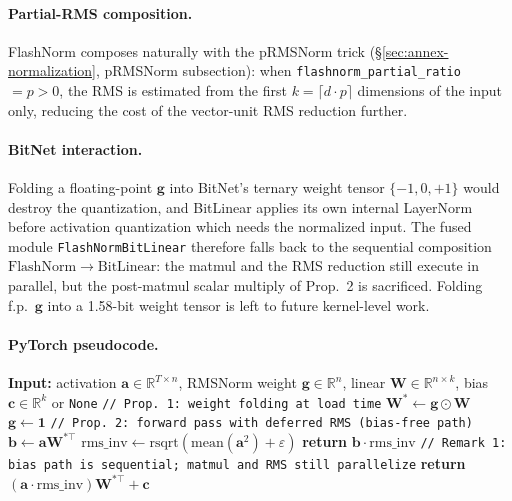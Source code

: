 \paragraph{Partial-RMS composition.}
FlashNorm composes naturally with the pRMSNorm trick (§\ref{sec:annex-normalization}, pRMSNorm subsection): when \texttt{flashnorm\_partial\_ratio} $=p>0$, the RMS is estimated from the first $k=\lceil d\cdot p\rceil$ dimensions of the input only, reducing the cost of the vector-unit RMS reduction further.

\paragraph{BitNet interaction.}
Folding a floating-point $\mathbf{g}$ into BitNet's ternary weight tensor $\{-1,0,+1\}$ \citep{wang_bitnet_2023} would destroy the quantization, and BitLinear applies its own internal LayerNorm before activation quantization which needs the normalized input. The fused module \texttt{FlashNormBitLinear} therefore falls back to the sequential composition $\mathrm{FlashNorm}\to\mathrm{BitLinear}$: the matmul and the RMS reduction still execute in parallel, but the post-matmul scalar multiply of Prop.~2 is sacrificed. Folding f.p.~$\mathbf{g}$ into a 1.58-bit weight tensor is left to future kernel-level work.

\paragraph{PyTorch pseudocode.}
\begin{algorithmic}[1]
\State \textbf{Input:} activation $\mathbf{a}\in\mathbb{R}^{T\times n}$, RMSNorm weight $\mathbf{g}\in\mathbb{R}^{n}$, linear $\mathbf{W}\in\mathbb{R}^{n\times k}$, bias $\mathbf{c}\in\mathbb{R}^{k}$ or \texttt{None}
\State \texttt{// Prop. 1: weight folding at load time}
\State $\mathbf{W}^{*}\gets \mathbf{g}\odot\mathbf{W}$ 
\State $\mathbf{g}\gets \mathbf{1}$ 
\State \texttt{// Prop. 2: forward pass with deferred RMS (bias-free path)}
\State $\mathbf{b}\gets \mathbf{a}\mathbf{W}^{*\top}$ 
\State $\mathrm{rms\_inv}\gets \mathrm{rsqrt}(\mathrm{mean}(\mathbf{a}^{2})+\varepsilon)$ 
    \State \textbf{return} $\mathbf{b}\cdot\mathrm{rms\_inv}$ 
\Else
    \State \texttt{// Remark 1: bias path is sequential; matmul and RMS still parallelize}
    \State \textbf{return} $(\mathbf{a}\cdot\mathrm{rms\_inv})\mathbf{W}^{*\top}+\mathbf{c}$
\EndIf
\end{algorithmic}


